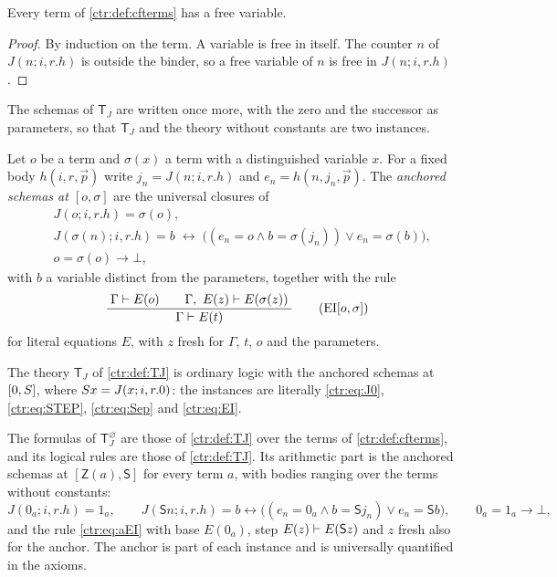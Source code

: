 \begin{lemma}\label{ctr:lem:cffree}
Every term of \cref{ctr:def:cfterms} has a free variable.
\end{lemma}
\begin{proof}
By induction on the term. A variable is free in itself. The counter $n$ of $J(n;i,r.h)$ is
outside the binder, so a free variable of $n$ is free in $J(n;i,r.h)$.
\end{proof}

The schemas of $\mathsf T_J$ are written once more, with the zero and the successor as
parameters, so that $\mathsf T_J$ and the theory without constants are two instances.

\begin{definition}\label{ctr:def:anchored}
Let $o$ be a term and $\sigma(x)$ a term with a distinguished variable $x$. For a fixed body
$h(i,r,\vec p)$ write $j_n=J(n;i,r.h)$ and $e_n=h(n,j_n,\vec p)$. The \emph{anchored
schemas at $[o,\sigma]$} are the universal closures of
\begin{align}
 & J(o;i,r.h)=\sigma(o), \tag{J0$[o,\sigma]$}\label{ctr:eq:aJ0}\\
 & J(\sigma(n);i,r.h)=b\;\leftrightarrow\;
   \bigl((e_n=o\land b=\sigma(j_n))\lor e_n=\sigma(b)\bigr), \tag{STEP$[o,\sigma]$}\label{ctr:eq:aSTEP}\\
 & o=\sigma(o)\to\bot, \tag{Sep$[o,\sigma]$}\label{ctr:eq:aSep}
\end{align}
with $b$ a variable distinct from the parameters, together with the rule
\begin{equation}\label{ctr:eq:aEI}
 \dfrac{\;\Gamma\vdash E(o)\qquad \Gamma,\ E(z)\vdash E(\sigma(z))\;}{\;\Gamma\vdash E(t)\;}
 \tag{EI$[o,\sigma]$}
\end{equation}
for literal equations $E$, with $z$ fresh for $\Gamma$, $t$, $o$ and the parameters.
\end{definition}

The theory $\mathsf T_J$ of \cref{ctr:def:TJ} is ordinary logic with the anchored schemas at
$[0,S]$, where $S x=J(x;i,r.0)$: the instances are literally \eqref{ctr:eq:J0},
\eqref{ctr:eq:STEP}, \eqref{ctr:eq:Sep} and \eqref{ctr:eq:EI}.

\begin{definition}\label{ctr:def:TJ0}
The formulas of $\mathsf T_J^{\varnothing}$ are those of \cref{ctr:def:TJ} over the terms of
\cref{ctr:def:cfterms}, and its logical rules are those of \cref{ctr:def:TJ}. Its arithmetic
part is the anchored schemas at $[\mathsf Z(a),\mathsf S]$ for every term $a$, with bodies
ranging over the terms without constants:
\[
 J(0_a;i,r.h)=1_a,\qquad
 J(\mathsf S n;i,r.h)=b\leftrightarrow\bigl((e_n=0_a\land b=\mathsf S j_n)\lor e_n=\mathsf S b\bigr),
 \qquad 0_a=1_a\to\bot,
\]
and the rule \eqref{ctr:eq:aEI} with base $E(0_a)$, step $E(z)\vdash E(\mathsf S z)$ and
$z$ fresh also for the anchor. The anchor is part of each instance and is universally
quantified in the axioms.
\end{definition}

